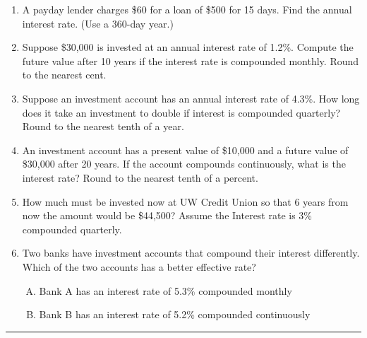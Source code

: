 \documentclass[12pt]{article}
\begin{document}
\begin{enumerate}
\item A payday lender charges \$60 for a loan of \$500 for 15 days. Find the annual interest rate. (Use a 360-day year.)
\vspace{2.5cm}

\item Suppose \$30,000 is invested at an annual interest rate of 1.2\%.  Compute the future value after 10 years if the interest rate is compounded monthly.  Round to the nearest cent.
\vspace{2.5cm}

\item Suppose an investment account has an annual interest rate of 4.3\%.  How long does it take an investment to double if interest is compounded quarterly?  Round to the nearest tenth of a year.
\vspace{2.5cm}

\item An investment account has a present value of \$10,000  and a future value of \$30,000 after 20 years. If the account compounds continuously, what is the interest rate?  Round to the nearest tenth of a percent.
\vspace{3.0cm}

\item How much must be invested now at UW Credit Union so that 6 years from now the
amount would be \$44,500? Assume the Interest rate is 3\% compounded quarterly.
\vspace{3.0cm}

\item Two banks have investment accounts that compound their interest differently.  Which of the two accounts has a better effective rate?
\begin{enumerate}[A)]
	\item Bank A has an interest rate of 5.3\% compounded monthly
	\item Bank B has an interest rate of 5.2\% compounded continuously
\end{enumerate}
\end{enumerate}
\vspace{3.0cm}

\begin{center}\rule{4cm}{0.4pt}\end{center}
\end{document}
